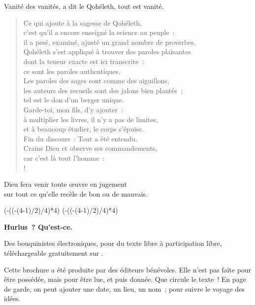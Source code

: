\documentclass[french,twoside]{book} %
\def\mednobreak{\ifdim\lastskip<\medskipamount
  \removelastskip\nopagebreak\medskip\fi}
\newcommand{\labelblock}[1]{\medbreak{\noindent\color{rubric}\bfseries #1}\par\mednobreak}
\def\truncdiv#1#2{((#1-(#2-1)/2)/#2)}
\def\moduloop#1#2{(#1-\truncdiv{#1}{#2}*#2)}
\def\modulo#1#2{\number\numexpr\moduloop{#1}{#2}\relax}
\begin{document}
\labelblock{Appendice}

Vanité des vanités, a dit le Qohéleth, tout est vanité.\\

\begin{verse}
Ce qui ajoute à la sagesse de Qohéleth, \\
c’est qu’il a encore enseigné la science au peuple ; \\
il a pesé, examiné, ajusté un grand nombre de proverbes.\\
Qohéleth s’est appliqué à trouver des paroles plaisantes \\
dont la teneur exacte est ici transcrite : \\
ce sont les paroles authentiques.\\
Les paroles des sages sont comme des aiguillons, \\
les auteurs des recueils sont des jalons bien plantés ; \\
tel est le don d’un berger unique.\\
Garde-toi, mon fils, d’y ajouter : \\
à multiplier les livres, il n’y a pas de limites, \\
et à beaucoup étudier, le corps s’épuise.\\
Fin du discours : Tout a été entendu. \\
Crains Dieu et observe ses commandements, \\
car c’est là tout l’homme :\\!
\end{verse}
Dieu fera venir toute œuvre en jugement \\
sur tout ce qu’elle recèle de bon ou de mauvais.\\
\noindent 
 


\ifbooklet
  \pagestyle{empty}
  \clearpage
  \ifnum\modulo{\value{page}}{4}=0 \hbox{}\newpage\hbox{}\newpage\fi
  \ifnum\modulo{\value{page}}{4}=1 \hbox{}\newpage\hbox{}\newpage\fi


  \hbox{}\newpage
  \ifodd\value{page}\hbox{}\newpage\fi
  {\centering\color{rubric}\bfseries\noindent\large
    Hurlus ? Qu’est-ce.\par
    \bigskip
  }
  \noindent Des bouquinistes électroniques, pour du texte libre à participation libre,
  téléchargeable gratuitement sur \href{https://hurlus.fr}{}.\par
  \bigskip
  \noindent Cette brochure a été produite par des éditeurs bénévoles.
  Elle n’est pas faîte pour être possédée, mais pour être lue, et puis donnée.
  Que circule le texte !
  En page de garde, on peut ajouter une date, un lieu, un nom ; pour suivre le voyage des idées.
  \par
\end{document}
